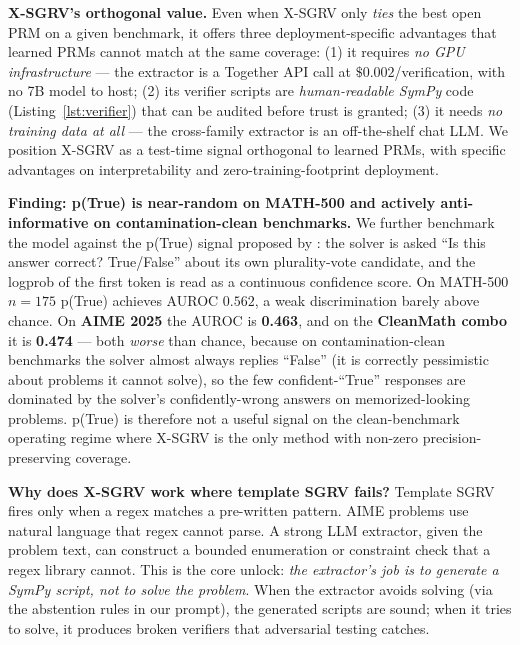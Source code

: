 \documentclass{article}
\begin{document}
\textbf{X-SGRV's orthogonal value.} Even when X-SGRV only \emph{ties} the best open PRM on a given benchmark, it offers three deployment-specific advantages that learned PRMs cannot match at the same coverage: (1) it requires \emph{no GPU infrastructure} --- the extractor is a Together API call at $\$0.002$/verification, with no 7B model to host; (2) its verifier scripts are \emph{human-readable SymPy} code (Listing~\ref{lst:verifier}) that can be audited before trust is granted; (3) it needs \emph{no training data at all} --- the cross-family extractor is an off-the-shelf chat LLM. We position X-SGRV as a test-time signal orthogonal to learned PRMs, with specific advantages on interpretability and zero-training-footprint deployment.

\textbf{Finding: p(True) is near-random on MATH-500 and actively anti-informative on contamination-clean benchmarks.} We further benchmark the model against the p(True) signal proposed by \citet{kadavath2022}: the solver is asked ``Is this answer correct? True/False'' about its own plurality-vote candidate, and the logprob of the first token is read as a continuous confidence score. On MATH-500 $n{=}175$ p(True) achieves AUROC $0.562$, a weak discrimination barely above chance. On \textbf{AIME 2025} the AUROC is \textbf{0.463}, and on the \textbf{CleanMath combo} it is \textbf{0.474} --- both \emph{worse} than chance, because on contamination-clean benchmarks the solver almost always replies ``False'' (it is correctly pessimistic about problems it cannot solve), so the few confident-``True'' responses are dominated by the solver's confidently-wrong answers on memorized-looking problems. p(True) is therefore not a useful signal on the clean-benchmark operating regime where X-SGRV is the only method with non-zero precision-preserving coverage.

\textbf{Why does X-SGRV work where template SGRV fails?} Template SGRV fires only when a regex matches a pre-written pattern. AIME problems use natural language that regex cannot parse. A strong LLM extractor, given the problem text, can construct a bounded enumeration or constraint check that a regex library cannot. This is the core unlock: \emph{the extractor's job is to generate a SymPy script, not to solve the problem}. When the extractor avoids solving (via the abstention rules in our prompt), the generated scripts are sound; when it tries to solve, it produces broken verifiers that adversarial testing catches.
\end{document}
